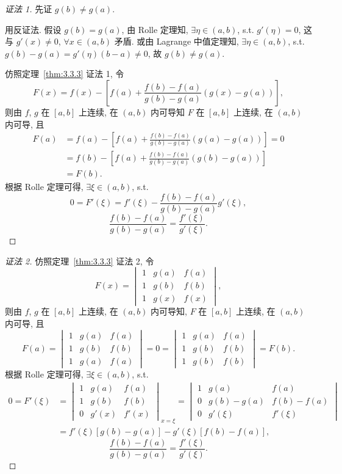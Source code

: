 \begin{proof}[证法 1]
先证 $g(b)\neq g(a)$.

用反证法. 假设 $g(b)=g(a)$, 由 Rolle 定理知, $\exists\eta\in(a,b)$, s.t. $g'(\eta)=0$, 这与 $g'(x)\neq0$, $\forall x\in(a,b)$ 矛盾. 或由 Lagrange 中值定理知, $\exists\eta\in(a,b)$, s.t. $g(b)-g(a)=g'(\eta)(b-a)\neq0$, 故 $g(b)\neq g(a)$.

仿照定理~\ref{thm:3.3.3} 证法 1, 令
\[
F(x)=f(x)-\left[f(a)+\frac{f(b)-f(a)}{g(b)-g(a)}(g(x)-g(a))\right],
\]
则由 $f$, $g$ 在 $[a,b]$ 上连续, 在 $(a,b)$ 内可导知 $F$ 在 $[a,b]$ 上连续, 在 $(a,b)$ 内可导, 且
\[
\begin{aligned}
F(a)&=f(a)-\left[f(a)+\frac{f(b)-f(a)}{g(b)-g(a)}(g(a)-g(a))\right]=0\\
&=f(b)-\left[f(a)+\frac{f(b)-f(a)}{g(b)-g(a)}(g(b)-g(a))\right]\\
&=F(b).
\end{aligned}
\]
根据 Rolle 定理可得, $\exists\xi\in(a,b)$, s.t.
\[
0=F'(\xi)=f'(\xi)-\frac{f(b)-f(a)}{g(b)-g(a)}g'(\xi),
\]
\[
\frac{f(b)-f(a)}{g(b)-g(a)}=\frac{f'(\xi)}{g'(\xi)}.
\]
\end{proof}

\begin{proof}[证法 2]
仿照定理~\ref{thm:3.3.3} 证法 2, 令
\[
F(x)=\begin{vmatrix}1&g(a)&f(a)\\1&g(b)&f(b)\\1&g(x)&f(x)\end{vmatrix},
\]
则由 $f$, $g$ 在 $[a,b]$ 上连续, 在 $(a,b)$ 内可导知, $F$ 在 $[a,b]$ 上连续, 在 $(a,b)$ 内可导, 且
\[
F(a)=\begin{vmatrix}1&g(a)&f(a)\\1&g(b)&f(b)\\1&g(a)&f(a)\end{vmatrix}=0=\begin{vmatrix}1&g(a)&f(a)\\1&g(b)&f(b)\\1&g(b)&f(b)\end{vmatrix}=F(b).
\]
根据 Rolle 定理可得, $\exists\xi\in(a,b)$, s.t.
\[
\begin{aligned}
0=F'(\xi)&=\begin{vmatrix}1&g(a)&f(a)\\1&g(b)&f(b)\\0&g'(x)&f'(x)\end{vmatrix}_{x=\xi}=\begin{vmatrix}1&g(a)&f(a)\\0&g(b)-g(a)&f(b)-f(a)\\0&g'(\xi)&f'(\xi)\end{vmatrix}\\
&=f'(\xi)[g(b)-g(a)]-g'(\xi)[f(b)-f(a)],
\end{aligned}
\]
\[
\frac{f(b)-f(a)}{g(b)-g(a)}=\frac{f'(\xi)}{g'(\xi)}.
\]
\end{proof}

